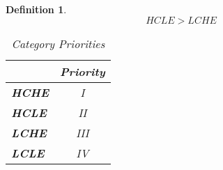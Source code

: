 \documentclass[conference]{IEEEtran}
\newtheorem{definition}{Definition}
\begin{document}
\begin{definition}
\[\textrm{$HCLE > LCHE$} \]
 
\begin{table}[h]
\captionsetup{justification=centering}
\centering
\begin{tabular}{l|c|}
\cline{2-2}
                                          & \multicolumn{1}{l|}{\textbf{Priority}} \\ \hline
\multicolumn{1}{|l|}{\textbf{HCHE}}  & I                                      \\ \hline
\multicolumn{1}{|l|}{\textbf{HCLE}}  & II                                     \\ \hline
\multicolumn{1}{|l|}{\textbf{LCHE}} & III                                     \\ \hline
\multicolumn{1}{|l|}{\textbf{LCLE}} & IV                                      \\ \hline
\end{tabular}

\caption{Category Priorities} %
\label{tbl:priority} %

\end{table} 

\end{definition}



\end{document}
